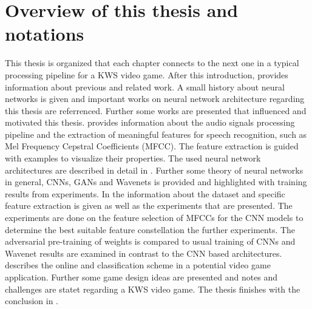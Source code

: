 
\section{Overview of this thesis and notations}\label{sec:intro_overview}
\thesisStateReady
This thesis is organized that each chapter connects to the next one in a typical processing pipeline for a KWS video game.
After this introduction,  provides information about previous and related work.
A small history about neural networks is given and important works on neural network architecture regarding this thesis are referrenced.
Further some works are presented that influenced and motivated this thesis.
 provides information about the audio signals processing pipeline and the extraction of meaningful features for speech recognition, such as Mel Frequency Cepstral Coefficients (MFCC).
The feature extraction is guided with examples to visualize their properties.
The used neural network architectures are described in detail in . 
Further some theory of neural networks in general, CNNs, GANs and Wavenets is provided and highlighted with training results from experiments.
In the  information about the dataset and specific feature extraction is given as well as the experiments that are presented.
The experiments are done on the feature selection of MFCCs for the CNN models to determine the best suitable feature constellation the further experiments.
The adversarial pre-training of weights is compared to usual training of CNNs and Wavenet results are examined in contrast to the CNN based architectures.
 describes the online and classification scheme in a potential video game application.
Further some game design ideas are presented and notes and challenges are statet regarding a KWS video game.
The thesis finishes with the conclusion in .



